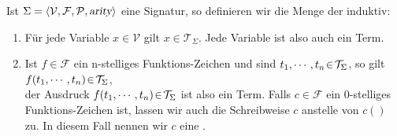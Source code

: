 \begin{Definition}
  Ist $\Sigma = \langle \mathcal{V}, \mathcal{F}, \mathcal{P}, \textsl{arity} \rangle$ eine Signatur, so definieren wir die Menge der 
    induktiv:
  \begin{enumerate}
  \item Für jede Variable $x \in \mathcal{V}$ gilt $x \in \mathcal{T}_\Sigma$.  Jede Variable ist also auch
        ein Term.
  \item Ist $f \in \mathcal{F}$ ein n-stelliges Funktions-Zeichen und sind 
        $t_1,\cdots,t_n \!\in\! \mathcal{T}_\Sigma$, so gilt 
        \\[0.2cm]
        \hspace*{1.3cm} $f(t_1,\cdots,t_n) \!\in\! \mathcal{T}_\Sigma$,
        \\[0.2cm]
        der Ausdruck  $f(t_1,\cdots,t_n) \!\in\! \mathcal{T}_\Sigma$ ist also ein Term.
        Falls $c \in \mathcal{F}$ ein 0-stelliges Funktions-Zeichen ist, lassen wir auch die Schreibweise
        $c$ anstelle von $c()$ zu.  In diesem Fall nennen wir $c$ eine .
        \eox
  \end{enumerate}
\end{Definition}


